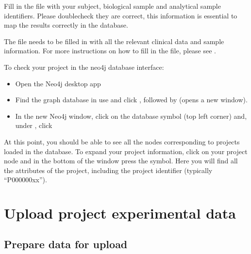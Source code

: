 \documentclass[letterpaper,10pt,english]{sphinxmanual}
\begin{document}
Fill in the  file with your subject, biological sample and analytical sample identifiers. Please double\sphinxhyphen{}check they are correct, this information is essential to map the results correctly in the database.

The  file needs to be filled in with all the relevant clinical data and sample information. For more instructions on how to fill in the file, please see {\hyperref[\detokenize{getting_started/upload-data:upload-data}]{}}.

To check your project in the neo4j database interface:
\begin{itemize}
\item {} 
Open the Neo4j desktop app

\item {} 
Find the graph database in use and click , followed by  (opens a new window).

\item {} 
In the new Neo4j window, click on the database symbol (top left corner) and, under , click 

\end{itemize}

At this point, you should be able to see all the nodes corresponding to projects loaded in the database.
To expand your project information, click on your project node and in the bottom of the window press the \sphinxcode{\sphinxupquote{\textless{}}} symbol. Here you will find all the attributes of the project, including the project identifier (typically “P000000xx”).


\section{Upload project experimental data}
\label{\detokenize{getting_started/upload-data:upload-project-experimental-data}}\label{\detokenize{getting_started/upload-data:upload-data}}\label{\detokenize{getting_started/upload-data::doc}}

\subsection{Prepare data for upload}
\label{\detokenize{getting_started/upload-data:prepare-data-for-upload}}
\end{document}
